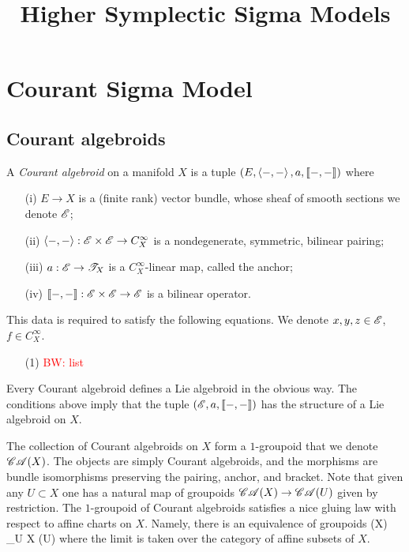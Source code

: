 \documentclass{amsart}
\def\brian{\textcolor{red}{BW: }\textcolor{red}}
\def\CA{\sC\sA}
\begin{document}
\title{Higher Symplectic Sigma Models}



\section{Courant Sigma Model}

\subsection{Courant algebroids}

\begin{dfn}
A {\em Courant algebroid} on a manifold $X$ is a tuple $(E, \left\langle-,-\right\rangle, a, \llbracket-,-\rrbracket)$ where 
\begin{itemize}
\item[(i)] $E \to X$ is a (finite rank) vector bundle, whose sheaf of smooth sections we denote $\mathscr E$;
\item[(ii)] $\left\langle-,-\right\rangle : \mathscr E \times \mathscr E \to C^\infty_X$ is a nondegenerate, symmetric, bilinear pairing;
\item[(iii)] $a : \mathscr E \to \mathscr T_X$ is a $C^\infty_X$-linear map, called the anchor;
\item[(iv)] $\llbracket-,-\rrbracket : \mathscr E \times \mathscr E \to \mathscr E$ is a bilinear operator.
\end{itemize}
This data is required to satisfy the following equations. 
We denote $x,y,z \in \mathscr E$, $f \in C^\infty_X$.
\begin{itemize}
\item[(1)] \brian{list}
\end{itemize}
\end{dfn}

Every Courant algebroid defines a Lie algebroid in the obvious way.
The conditions above imply that the tuple $(\mathscr E, a, \llbracket-,-\rrbracket)$ has the structure of a Lie algebroid on $X$. 

The collection of Courant algebroids on $X$ form a $1$-groupoid that we denote $\CA(X)$.
The objects are simply Courant algebroids, and the morphisms are bundle isomorphisms preserving the pairing, anchor, and bracket. 
Note that given any $U \subset X$ one has a natural map of groupoids $\CA(X) \to \CA(U)$ given by restriction.
The $1$-groupoid of Courant algebroids satisfies a nice gluing law with respect to affine charts on $X$. 
Namely, there is an equivalence of groupoids 
\ben
\CA(X) \simeq \lim_{U \subset X} \CA(U)
\een
where the limit is taken over the category of affine subsets of $X$. 
\end{document}
